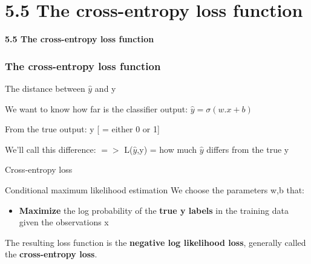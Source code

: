 \documentclass[13.5pt,aspecratio=169]{beamer}
\begin{document}
\section{5.5 The cross-entropy loss function}

\begin{frame}
    \bigskip
    \color{blue} \Huge \textbf{5.5 The cross-entropy loss function} 
\end{frame}

\begin{frame}
    \frametitle{The cross-entropy loss function}
    {\Large The distance between $\hat{y}$ and y}
    \bigskip
    \begin{block}{We want to know how far is the classifier output:}
        {\hphantom{xyz}  $\hat{y} = \sigma(w.x+b)$ }

    \end{block}

    \begin{block}{From the true output:}
        {\hphantom{xyz} y     [ = either 0 or 1]} 
    \end{block}
    \begin{block}{ We'll call this difference:}
        $=>$ L($\hat{y}$,y) = how much $\hat{y}$ differs from the true y 
    \end{block}
\end{frame}
\begin{frame}{Cross-entropy loss}
    \begin{block}{\Large Conditional maximum likelihood estimation}
        We choose the parameters w,b that: 
        \begin{itemize}
            \item \textbf{Maximize} the log probability 
            of the \textbf{true y labels} in the training data 
             given the observations x
        \end{itemize}
    \end{block}
    \begin{exampleblock}{}
         The resulting loss function is the \textbf{ negative log likelihood loss}, generally called the \textbf{cross-entropy loss}.
    \end{exampleblock}
\end{frame}
\end{document}
